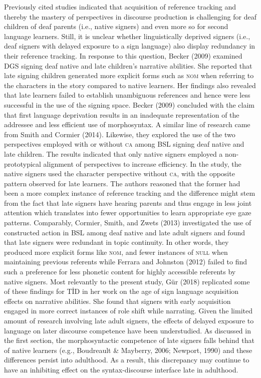 \documentclass[
  english,
  doc,mask]{apa6}
\begin{document}
Previously cited studies indicated that acquisition of reference tracking and thereby the mastery of perspectives in discourse production is challenging for deaf children of deaf parents (i.e., native signers) and even more so for second language learners. Still, it is unclear whether linguistically deprived signers (i.e., deaf signers with delayed exposure to a sign language) also display redundancy in their reference tracking. In response to this question, Becker (2009) examined DGS signing deaf native and late children's narrative abilities. She reported that late signing children generated more explicit forms such as \textsc{nom} when referring to the characters in the story compared to native learners. Her findings also revealed that late learners failed to establish unambiguous references and hence were less successful in the use of the signing space. Becker (2009) concluded with the claim that first language deprivation results in an inadequate representation of the addressee and less efficient use of morphosyntax. A similar line of research came from Smith and Cormier (2014). Likewise, they explored the use of the two perspectives employed with or without \textsc{ca} among BSL signing deaf native and late children. The results indicated that only native signers employed a non-prototypical alignment of perspectives to increase efficiency. In the study, the native signers used the character perspective without \textsc{ca}, with the opposite pattern observed for late learners. The authors reasoned that the former had been a more complex instance of reference tracking and the difference might stem from the fact that late signers have hearing parents and thus engage in less joint attention which translates into fewer opportunities to learn appropriate eye gaze patterns. Comparably, Cormier, Smith, and Zwets (2013) investigated the use of constructed action in BSL among deaf native and late adult signers and found that late signers were redundant in topic continuity. In other words, they produced more explicit forms like \textsc{nom}, and fewer instances of \textsc{null} when maintaining previous referents while Ferrara and Johnston (2012) failed to find such a preference for less phonetic content for highly accessible referents by native signers. Most relevantly to the present study, Gür (2018) replicated some of these findings for TİD in her work on the age of sign language acquisition effects on narrative abilities. She found that signers with early acquisition engaged in more correct instances of role shift while narrating. Given the limited amount of research involving late adult signers, the effects of delayed exposure to language on later discourse competence have been understudied. As discussed in the first section, the morphosyntactic competence of late signers falls behind that of native learners (e.g., Boudreault \& Mayberry, 2006; Newport, 1990) and these differences persist into adulthood. As a result, this discrepancy may continue to have an inhibiting effect on the syntax-discourse interface late in adulthood.
\end{document}
